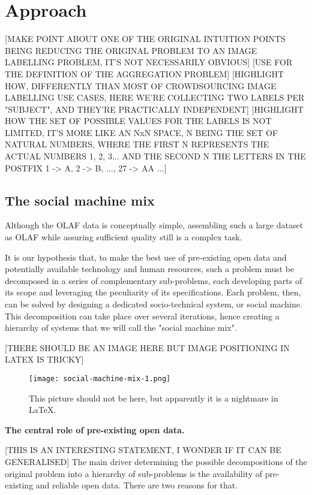 \section{Approach}

[MAKE POINT ABOUT ONE OF THE ORIGINAL INTUITION POINTS BEING REDUCING THE ORIGINAL PROBLEM TO AN IMAGE LABELLING PROBLEM, IT'S NOT NECESSARILY OBVIOUS]
[USE \cite{Quinn:2011dj} FOR THE DEFINITION OF THE AGGREGATION PROBLEM]
[HIGHLIGHT HOW, DIFFERENTLY THAN MOST OF CROWDSOURCING IMAGE LABELLING USE CASES, HERE WE'RE COLLECTING TWO LABELS PER "SUBJECT", AND THEY'RE PRACTICALLY INDEPENDENT]
[HIGHLIGHT HOW THE SET OF POSSIBLE VALUES FOR THE LABELS IS NOT LIMITED, IT'S MORE LIKE AN NxN SPACE, N BEING THE SET OF NATURAL NUMBERS, WHERE THE FIRST N REPRESENTS THE ACTUAL NUMBERS 1, 2, 3... AND THE SECOND N THE LETTERS IN THE POSTFIX 1 -> A, 2 -> B, ..., 27 -> AA ...]

\subsection{The social machine mix}

    Although the OLAF data is conceptually simple, assembling such a large dataset as OLAF while assuring sufficient quality still is a complex task.
    
    It is our hypothesis that, to make the best use of pre-existing open data and potentially available technology and human resources, such a problem must be decomposed in a series of complementary sub-problems, each developing parts of its scope and leveraging the peculiarity of its specifications. Each problem, then, can be solved by designing a dedicated socio-technical system, or social machine. This decomposition can take place over several iterations, hence creating a hierarchy of systems that we will call the "social machine mix". 
    
    [THERE SHOULD BE AN IMAGE HERE BUT IMAGE POSITIONING IN LATEX IS TRICKY]

    \begin{figure*}
    	\texttt{[image: social-machine-mix-1.png]}
    	\caption{This picture should not be here, but apparently it is a nightmare in LaTeX.}
    	\label{fig:social_machine_mix_1}
    \end{figure*}
    
    \textbf{The central role of pre-existing open data.} 
    
    [THIS IS AN INTERESTING STATEMENT, I WONDER IF IT CAN BE GENERALISED] The main driver determining the possible decompositions of the original problem into a hierarchy of sub-problems is the availability of pre-existing and reliable open data. There are two reasons for that.

